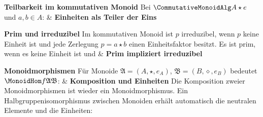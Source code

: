 \begin{BandUebersicht}
\textbf{Teilbarkeit im kommutativen Monoid}
Bei \(\CommutativeMonoidAlg A\star e\) und \(a,b\in A\):
&
\textbf{Einheiten als Teiler der Eins}
 \\
\addlinespace[.8ex]

\textbf{Prim und irreduzibel}
Im kommutativen Monoid ist \(p\) irreduzibel, wenn \(p\) keine
Einheit ist und jede Zerlegung \(p=a\star b\) einen Einheitsfaktor besitzt.
Es ist prim, wenn es keine Einheit ist und
&
\textbf{Prim impliziert irreduzibel}
 \\
\addlinespace[.8ex]

\textbf{Monoidmorphismen}
Für Monoide \(\mathfrak A=(A,\star,e_A)\),
\(\mathfrak B=(B,\diamond,e_B)\) bedeutet
\(\MonoidHom f{\mathfrak A}{\mathfrak B}\):
&
\textbf{Komposition und Einheiten}
Die Komposition zweier Monoidmorphismen ist wieder ein
Monoidmorphismus. Ein Halbgruppenisomorphismus zwischen Monoiden
erhält automatisch die neutralen Elemente und die Einheiten:
 \\
\addlinespace[.8ex]


\end{BandUebersicht}
